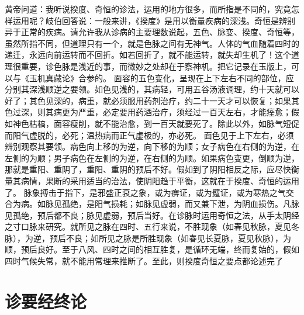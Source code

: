 \documentclass[a4paper,12pt,UTF8,twoside]{ctexbook}
\begin{document}
黄帝问道：我听说揆度、奇恒的诊法，运用的地方很多，而所指是不同的，究竟怎样运用呢？岐伯回答说：一般来讲，《揆度》是用以衡量疾病的深浅。奇恒是辨别异于正常的疾病。请允许我从诊病的主要理数说起，五色、脉变、揆度、奇恒等，虽然所指不同，但道理只有一个，就是色脉之间有无神气。人体的气血随着四时的递迁，永远向前运转而不回折。如若回折了，就不能运转，就失却生机了！这个道理很重要，诊色脉是浅近的事，而微妙之处却在于察神机。把它记录在玉版上，可以与《玉机真藏论》合参的。
面容的五色变化，呈现在上下左右不同的部位，应分别其深浅顺逆之要领。如色见浅的，其病轻，可用五谷汤液调理，约十天就可以好了；其色见深的，病重，就必须服用药剂治疗，约二十一天才可以恢复；如果其色过深，则其病更为严重，必定要用药酒治疗，须经过一百天左右，才能痊愈；假如神色枯槁，面容瘦削，就不能治愈，到一百天就要死了。除此以外，如脉气短促而阳气虚脱的，必死；温热病而正气虚极的，亦必死。
面色见于上下左右，必须辨别观察其要领。病色向上移的为逆，向下移的为顺；女子病色在右侧的为逆，在左侧的为顺；男子病色在左侧的为逆，在右侧的为顺。如果病色变更，倒顺为逆，那就是重阳、重阴了，重阳、重阴的预后不好。假如到了阴阳相反之际，应尽快衡量其病情，果断的采用适当的治法，使阴阳趋于平衡，这就在于揆度、奇恒的运用了。
脉象搏击于指下，是邪盛正衰之象，或为痹证，或为躄证，或为寒热之气交合为病。如脉见孤绝，是阳气损耗；如脉见虚弱，而又兼下泄，为阴血损伤。凡脉见孤绝，预后都不良；脉见虚弱，预后当好。在诊脉时运用奇恒之法，从手太阴经之寸口脉来研究。就所见之脉在四时、五行来说，不胜现象（如春见秋脉，夏见冬脉），为逆，预后不良；如所见之脉是所胜现象（如春见长夏脉，夏见秋脉），为顺，预后良好。至于八风、四时之间的相互胜复，是循环无端，终而复始的，假如四时气候失常，就不能用常理来推断了。至此，则揆度奇恒之要点都论述完了

\chapter{诊要经终论}
\end{document}
